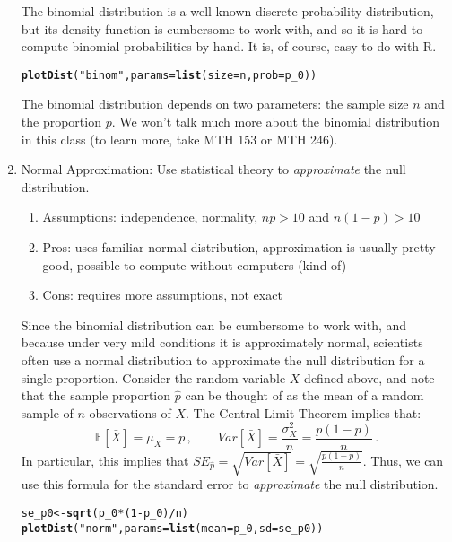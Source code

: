 \documentclass[10pt]{article}\usepackage[]{graphicx}\usepackage[]{color}
\makeatletter
\newcommand{\hlnum}[1]{\textcolor[rgb]{0.686,0.059,0.569}{#1}}%
\newcommand{\hlstr}[1]{\textcolor[rgb]{0.192,0.494,0.8}{#1}}%
\newcommand{\hlopt}[1]{\textcolor[rgb]{0,0,0}{#1}}%
\newcommand{\hlstd}[1]{\textcolor[rgb]{0.345,0.345,0.345}{#1}}%
\newcommand{\hlkwb}[1]{\textcolor[rgb]{0.69,0.353,0.396}{#1}}%
\newcommand{\hlkwc}[1]{\textcolor[rgb]{0.333,0.667,0.333}{#1}}%
\newcommand{\hlkwd}[1]{\textcolor[rgb]{0.737,0.353,0.396}{\textbf{#1}}}%
\newenvironment{kframe}{%
 \def\at@end@of@kframe{}%
 \ifinner\ifhmode%
  \def\at@end@of@kframe{\end{minipage}}%
  \begin{minipage}{\columnwidth}%
 \fi\fi%
 \def\FrameCommand##1{\hskip\@totalleftmargin \hskip-\fboxsep
 \colorbox{shadecolor}{##1}\hskip-\fboxsep
     \hskip-\linewidth \hskip-\@totalleftmargin \hskip\columnwidth}%
 \MakeFramed {\advance\hsize-\width
   \@totalleftmargin\z@ \linewidth\hsize
   \@setminipage}}%
 {\par\unskip\endMakeFramed%
 \at@end@of@kframe}
\newenvironment{knitrout}{}{} %
\newcommand{\R}{{\sf R}\xspace}
\newcommand{\Ex}{\mathbb{E}}
\makeatother
\begin{document}
\begin{enumerate}
  The binomial distribution is a well-known discrete probability distribution, but its density function is cumbersome to work with, and so it is hard to compute binomial probabilities by hand. It is, of course, easy to do with \R.
  
\begin{knitrout}
\color{fgcolor}\begin{kframe}
\begin{alltt}
\hlkwd{plotDist}\hlstd{(}\hlstr{"binom"}\hlstd{,} \hlkwc{params} \hlstd{=} \hlkwd{list}\hlstd{(}\hlkwc{size} \hlstd{= n,} \hlkwc{prob} \hlstd{= p_0))}
\end{alltt}
\end{kframe}
\end{knitrout}

  The binomial distribution depends on two parameters: the sample size $n$ and the proportion $p$. We won't talk much more about the binomial distribution in this class (to learn more, take MTH 153 or MTH 246). 

  \item Normal Approximation: Use statistical theory to \emph{approximate} the null distribution. 
  \begin{enumerate}
    \item Assumptions: independence, normality, $np > 10$ and $n(1-p) > 10$
    \item Pros: uses familiar normal distribution, approximation is usually pretty good, possible to compute without computers (kind of)
    \item Cons: requires more assumptions, not exact
  \end{enumerate}
  
  Since the binomial distribution can be cumbersome to work with, and because under very mild conditions it is approximately normal, scientists often use a normal distribution to approximate the null distribution for a single proportion. Consider the random variable $X$ defined above, and note that the sample proportion $\hat{p}$ can be thought of as the mean of a random sample of $n$ observations of $X$. The Central Limit Theorem implies that:
  $$
    \Ex[\bar{X}] = \mu_X = p \,, \qquad Var[\bar{X}] = \frac{\sigma^2_X}{n} = \frac{p(1-p)}{n} \,.
  $$
  In particular, this implies that $SE_{\hat{p}} = \sqrt{Var[\bar{X}]} = \sqrt{\frac{p(1-p)}{n}}$. Thus, we can use this formula for the standard error to \emph{approximate} the null distribution. 
  
\begin{knitrout}
\color{fgcolor}\begin{kframe}
\begin{alltt}
\hlstd{se_p0} \hlkwb{<-} \hlkwd{sqrt}\hlstd{(p_0} \hlopt{*} \hlstd{(}\hlnum{1}\hlopt{-}\hlstd{p_0)} \hlopt{/} \hlstd{n)}
\hlkwd{plotDist}\hlstd{(}\hlstr{"norm"}\hlstd{,} \hlkwc{params} \hlstd{=} \hlkwd{list}\hlstd{(}\hlkwc{mean} \hlstd{= p_0,} \hlkwc{sd} \hlstd{= se_p0))}
\end{alltt}
\end{kframe}
\end{knitrout}


\end{enumerate}
\end{document}
